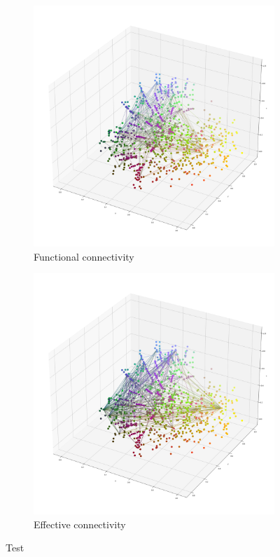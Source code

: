 \documentclass[]{article}
\begin{document}
\begin{figure}
\begin{subfigure}{.3\textwidth}
		\includegraphics[width=.9\linewidth]{plotted_figures/func_3d_conn_plot.png}
		\caption{Functional connectivity}
		\label{fig:func_conn_vis}
	\end{subfigure}
	\begin{subfigure}{.3\textwidth}
		\centering
		\includegraphics[width=.9\linewidth]{plotted_figures/eff_3d_conn_plot.png}
		\caption{Effective connectivity}
		\label{fig:eff_conn_vis}
	\end{subfigure}

	\caption{Test}
	\label{fig:conn_vis}
\end{figure}
\end{document}
